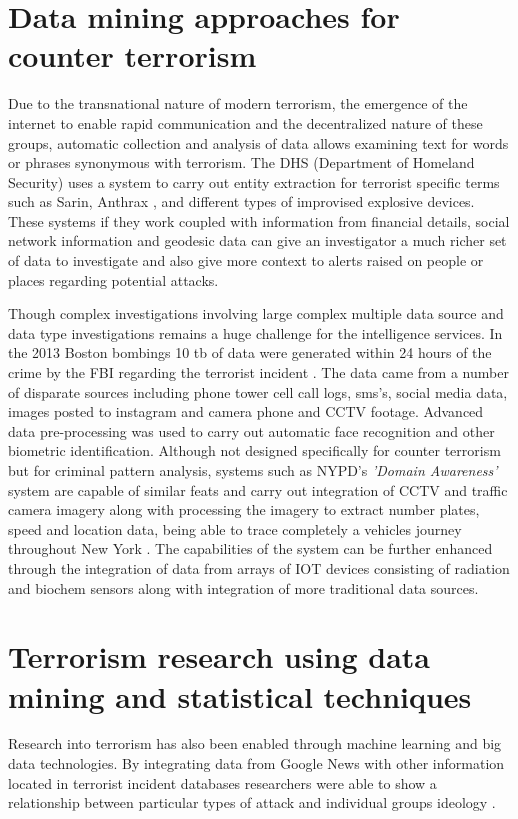 \section{Data mining approaches for counter terrorism}

Due to the transnational nature of  modern terrorism, the emergence of the internet to enable rapid communication and the decentralized nature of these groups, automatic collection and analysis of data allows examining text for words or phrases synonymous with terrorism.  The DHS (Department of Homeland Security) uses a system to carry out entity extraction for terrorist specific terms such as Sarin, Anthrax \citep{merrick2015outthinking}, and different types of improvised explosive devices. These systems if they work coupled with information from financial details, social network information and geodesic data can give an investigator a much richer set of data to investigate and also give more context to alerts raised on people or places regarding potential attacks. 

Though complex investigations involving large complex multiple data source and data type investigations remains a huge challenge for the intelligence services. In the 2013 Boston bombings 10 tb of data were generated within 24 hours of the crime by the FBI regarding the terrorist incident \citep{jeberson2015survey}. The data came from a number of disparate sources including phone tower cell call logs, sms's, social media data, images posted to instagram and camera phone and CCTV footage. Advanced data pre-processing was used to carry out automatic face recognition and other biometric identification. Although not designed specifically for counter terrorism but for criminal pattern analysis, systems such as NYPD's \textit{'Domain Awareness'} system are capable of similar feats and carry out integration of CCTV and traffic camera imagery along with processing the imagery to extract number plates, speed and location data, being able to trace completely a vehicles journey throughout New York \citep{coscarelli2012nypd}. The capabilities of the system can be further enhanced through the integration of data from arrays of IOT devices consisting of radiation and biochem sensors along with integration of more traditional data sources.

\section{Terrorism research using data mining and statistical techniques}
Research into terrorism has also been enabled through machine learning and big data technologies. By integrating data from Google News with other information located in terrorist incident databases researchers were able to show a relationship between particular types of attack and individual groups ideology \citep{strang2015analyzing}.

